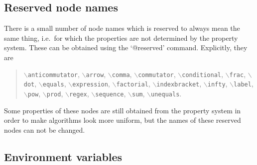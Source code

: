 \documentclass[11pt]{article}
\newenvironment{reserved}{\par\noindent\description}{\enddescription}
\newcommand{\texcommand}[1]{{\tt $\backslash$#1}}
\numberwithin{equation}{section}
\begin{document}
\subsection{Reserved node names}
\label{s:reserved_names}

There is a small number of node names which is reserved to always mean
the same thing, i.e.~for which the properties are not determined by
the property system. These can be obtained using the `@reserved'
command. Explicitly, they are
%
%
\begin{quote}
\texcommand{anticommutator},
\texcommand{arrow},
\texcommand{comma}, 
\texcommand{commutator}, 
\texcommand{conditional},
\texcommand{frac}, 
\texcommand{dot},
\texcommand{equals}, 
\texcommand{expression},
\texcommand{factorial},
\texcommand{indexbracket}, 
\texcommand{infty}, 
\texcommand{label},
\texcommand{pow}, 
\texcommand{prod}, 
\texcommand{regex}, 
\texcommand{sequence},
\texcommand{sum},
\texcommand{unequals}.
\end{quote}
Some properties of these nodes are still obtained from the property
system in order to make algorithms look more uniform, but the names of
these reserved nodes can not be changed.

\begin{reserved}



















\end{reserved}


\subsection{Environment variables}
\label{s:environment_variables}
\end{document}
